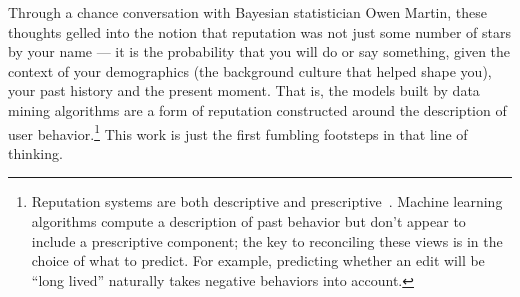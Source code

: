 Through a chance conversation with Bayesian statistician
Owen Martin, these thoughts gelled into the notion that reputation
was not just some number of stars by your name --- it is the probability
that you will do or say something, given the context of your demographics
(\ie the background culture that helped shape you),
your past history and the present moment.
That is, the models built by data mining algorithms are a form of
reputation constructed around the description of user
behavior.\footnote{Reputation systems are both descriptive and
prescriptive~\cite{Adler2007}.  Machine learning algorithms compute a
description of past behavior but don't appear to include a prescriptive
component; the key to reconciling these views is in the choice of what
to predict.  For example, predicting whether an edit will be ``long
lived'' naturally takes negative behaviors into account.}
This work is just the first fumbling footsteps in that line of thinking.

